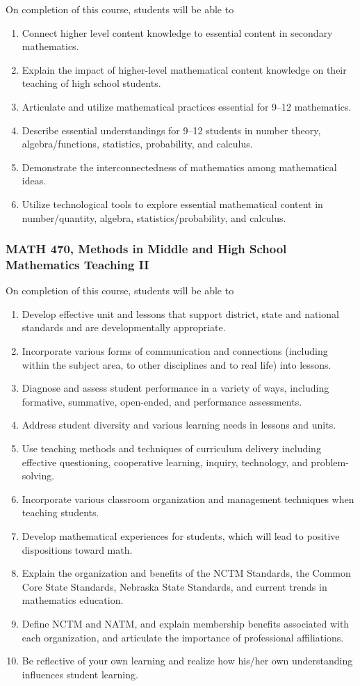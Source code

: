 \documentclass[11pt]{article}
\newenvironment{alphalist}{
\begin{enumerate}[label=(\arabic*),widest=107 ,leftmargin=25pt, itemsep=0pt]}
{\end{enumerate}}
\begin{document}
On  completion of this course, students will be able to
\begin{alphalist}

\item Connect higher level content knowledge to essential content in secondary mathematics.
\item Explain the impact of higher-level mathematical content knowledge on their teaching of high school students.
\item Articulate and utilize mathematical practices essential for 9--12 mathematics.
\item Describe essential understandings for 9--12 students in number theory, algebra/functions, statistics, probability, and calculus.
\item Demonstrate the interconnectedness of mathematics among mathematical ideas.
\item Utilize technological tools to explore essential mathematical content in number/quantity, algebra, statistics/probability, and calculus.
\end{alphalist}

\subsubsection{MATH 470, Methods in Middle and High School Mathematics Teaching II}

On completion of this course, students will be able to
\begin{alphalist}
\item Develop effective unit and lessons that support district, state and national standards and are developmentally appropriate.
\item Incorporate various forms of communication and connections (including within the subject area, to other disciplines and to real life) into lessons.
\item Diagnose and assess student performance in a variety of ways, including formative, summative, open-ended, and performance assessments.
\item Address student diversity and various learning needs in lessons and units.
\item Use teaching methods and techniques of curriculum delivery including effective questioning, cooperative learning, inquiry, technology, and problem-solving.
\item Incorporate various classroom organization and management techniques when teaching students.
\item Develop mathematical experiences for students, which will lead to positive dispositions toward math.
 \item Explain the organization and benefits of the NCTM Standards, the Common Core State Standards, Nebraska State Standards, and current trends in mathematics education.
\item Define NCTM and NATM, and explain membership benefits associated with each organization, and articulate the importance of professional affiliations.
\item Be reflective of your own learning and realize how his/her own understanding influences student learning.
\end{alphalist}
\end{document}
